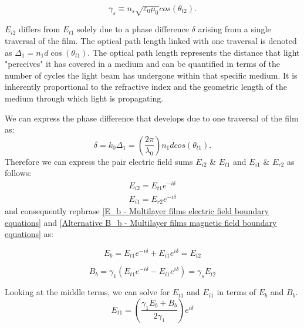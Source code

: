     \begin{equation} \label{gamma s}
        \gamma_s \equiv n_s \sqrt{\varepsilon_0\mu_0} cos(\theta_{t2}).
    \end{equation}

$E_{i2}$ differs from $E_{t1}$ solely due to a phase difference $\delta$ arising from a single traversal of the film. The optical path length linked with one traversal is denoted as $\Delta_1=n_1d\cos(\theta_{t1})$. The optical path length represents the distance that light "perceives" it has covered in a medium and can be quantified in terms of the number of cycles the light beam has undergone within that specific medium. It is inherently proportional to the refractive index and the geometric length of the medium through which light is propagating.

We can express the phase difference that develops due to one traversal of the film as:
    \begin{equation} \label{phase difference}
    \delta = k_0\Delta_1 = \left(\frac{2\pi}{\lambda_0}\right) n_1dcos(\theta_{t1}).
    \end{equation}
Therefore we can express the pair electric field sums $E_{i2}$ \& $E_{t1}$ and $E_{i1}$ \& $E_{r2}$ as follows:
    \begin{align*}
        E_{i2} = E_{t1}e^{-i\delta} \\
        E_{i1} = E_{r2}e^{-i\delta}
    \end{align*}
and consequently rephrase \ref{E_b - Multilayer films electric field boundary equations} and \ref{Alternative B_b - Multilayer films magnetic field boundary equations} as:

    \begin{equation} \label{E_b form after phase difference}
    E_b = E_{t1}e^{-i\delta} + E_{i1}e^{i\delta} = E_{t2}
    \end{equation}
    
    \begin{equation} \label{B_b form after phase difference}
    B_b = \gamma_1(E_{t1}e^{-i\delta} - E_{i1}e^{i\delta}) = \gamma_sE_{t2}
    \end{equation}

Looking at the middle terms, we can solve for $E_{t1}$ and $E_{i1}$ in terms of $E_b$ and $B_b$.
    \begin{equation} \label{E_t1}
    E_{t1} = \left(\frac{\gamma_1E_b + B_b}{2\gamma_1}\right)e^{i\delta}
    \end{equation}
    
